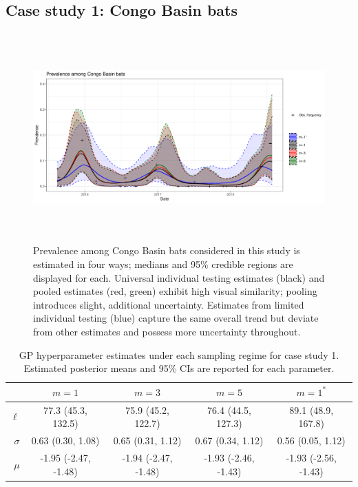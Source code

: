 \documentclass{article}
\begin{document}
\subsection{Case study 1: Congo Basin bats}

\begin{figure}[h!]
\centerline{\includegraphics[width=500pt,height=227pt]{Figure2.pdf}}
\caption{Prevalence among Congo Basin bats considered in this study is estimated in four ways; medians and 95\% credible regions are displayed for each. Universal individual testing estimates (black) and pooled estimates (red, green) exhibit high visual similarity; pooling introduces slight, additional uncertainty. Estimates from limited individual testing (blue) capture the same overall trend but deviate from other estimates and possess more uncertainty throughout. \label{fig2}}
\end{figure}

\begin{table} [h]
\caption{GP hyperparameter estimates under each sampling regime for case study 1. Estimated posterior means and 95\% CIs are reported for each parameter.} \centering
\begin{tabular}{ r | c   c   c   c  } \toprule
        & $m=1$ & $m=3$ & $m=5$ &  $m=1^*$\\
\midrule
$\ell$ & 77.3 (45.3, 132.5) & 75.9 (45.2, 122.7)  & 76.4 (44.5, 127.3) & 89.1 (48.9, 167.8)  \\
$\sigma$ & 0.63 (0.30, 1.08) & 0.65 (0.31, 1.12) & 0.67 (0.34, 1.12)  & 0.56  (0.05, 1.12) \\
$\mu$ & -1.95 (-2.47, -1.48) & -1.94  (-2.47,  -1.48) & -1.93 (-2.46,  -1.43) & -1.93 (-2.56,  -1.43) \\
\bottomrule 
\end{tabular}
\label{t3}
\end{table}
\end{document}
